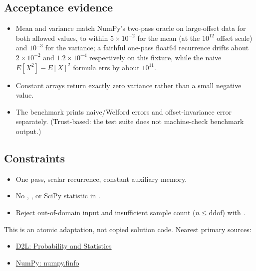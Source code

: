         \subsection{Acceptance evidence}

        \begin{evidencebox}
        \begin{itemize}
          \item Mean and variance match NumPy's two-pass oracle on large-offset data for both allowed  values, to within \(5\times10^{-2}\) for the mean (at the \(10^{12}\) offset scale) and \(10^{-3}\) for the variance; a faithful one-pass float64 recurrence drifts about \(2\times10^{-2}\) and \(1.2\times10^{-4}\) respectively on this fixture, while the naive \(E[X^2]-E[X]^2\) formula errs by about \(10^{11}\).
  \item Constant arrays return exactly zero variance rather than a small negative value.
  \item The benchmark prints naive/Welford errors and offset-invariance error separately. (Trust-based: the test suite does not machine-check benchmark output.)
        \end{itemize}
        \end{evidencebox}

        \subsection{Constraints}

        \begin{itemize}
          \item One pass, scalar recurrence, constant auxiliary memory.
  \item No , , or SciPy statistic in .
  \item Reject out-of-domain input and insufficient sample count ($n\le\mathrm{ddof}$) with .
        \end{itemize}

        \begin{sourcebox}
        This is an atomic adaptation, not copied solution code. Nearest primary sources:
        \begin{itemize}
          \item \href{https://d2l.ai/chapter_preliminaries/probability.html}{D2L: Probability and Statistics}
  \item \href{https://numpy.org/doc/stable/reference/generated/numpy.finfo.html}{NumPy: numpy.finfo}
        \end{itemize}
        \end{sourcebox}
